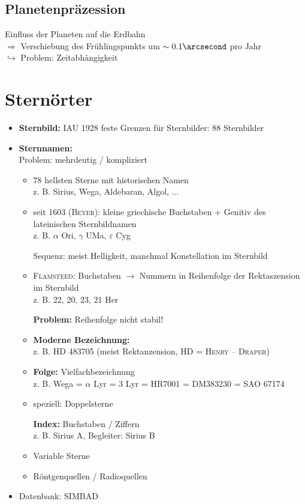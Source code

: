 \subsection{Planetenpräzession}
Einfluss der Planeten auf die Erdbahn\\
$\Rightarrow$ Verschiebung des Frühlingspunkts um $\sim 0.1\arcsecond$ pro Jahr \\
$\hookrightarrow$ Problem: Zeitabhängigkeit

\section{Sternörter}
\begin{itemize}
    \item \textbf{Sternbild:} IAU 1928 feste Grenzen für Sternbilder: 88 Sternbilder
    \item \textbf{Sternnamen:}\\
        Problem: mehrdeutig / kompliziert
        \begin{itemize}
            \item 78 hellsten Sterne mit historischen Namen\\
                z. B. Sirius, Wega, Aldebaran, Algol, ...
            \item seit 1603 (\textsc{Beyer}): kleine griechische Buchstaben + 
                Genitiv des lateinischen Sternbildnamen\\
                z. B. $\alpha$ Ori, $\gamma$ UMa, $\varepsilon$ Cyg

                Sequenz: meist Helligkeit, manchmal Konstellation im Sternbild
            \item \textsc{Flamsteed:} Buchstaben $\rightarrow$ Nummern in 
                Reihenfolge der Rektaszension im Sternbild\\
                z. B. 22, 20, 23, 21 Her

                \textbf{Problem:} Reihenfolge nicht stabil!
            \item \textbf{Moderne Bezeichnung:} \\
                z. B. HD 483705 (meist Rektanzension, HD = \textsc{Henry} -- \textsc{Draper})
            \item \textbf{Folge:} Vielfachbezeichnung\\
                z. B. Wega = $\alpha$ Lyr = 3 Lyr = HR7001 = DM383230 = SAO 67174
            \item speziell: Doppelsterne

                \textbf{Index:} Buchstaben / Ziffern \\
                z. B. Sirius A, Begleiter: Sirius B
            \item Variable Sterne
            \item Röntgenquellen / Radioquellen
        \end{itemize}
    \item Datenbank: SIMBAD
\end{itemize}

